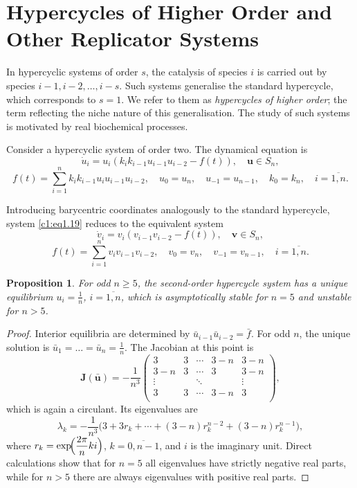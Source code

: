 \documentclass[12pt]{report}
\newtheorem{proposition}[theorem]{Proposition}
\theoremstyle{definition}
\theoremstyle{remark}
\begin{document}
\section{Hypercycles of Higher Order and Other Replicator Systems}
\label{c1:section:1.4}


In hypercyclic systems of order $s$, the catalysis of species $i$
is carried out by species $i-1, i-2, \ldots, i-s$. Such systems
generalise the standard hypercycle, which corresponds to $s=1$.
We refer to them as \emph{hypercycles of higher order}; the term
reflecting the niche nature of this generalisation. The study of
such systems is motivated by real biochemical processes.

Consider a hypercyclic system of order two.  The dynamical equation is
\begin{equation}
  \dot{u}_{i}=u_{i}(k_{i}k_{i-1}u_{i-1}u_{i-2}-f(t)),
  \quad \mathbf{u}\in S_{n},
  \label{c1:eq1.19}
\end{equation}
\[
  f(t)=\sum_{i=1}^{n}k_{i}k_{i-1}u_{i}u_{i-1}u_{i-2},\quad
  u_{0}=u_{n},\quad u_{-1}=u_{n-1},\quad k_{0}=k_{n},\quad
  i=\overline{1,n}.
\]

Introducing barycentric coordinates analogously to the standard
hypercycle, system \eqref{c1:eq1.19} reduces to the equivalent system
\begin{equation}
  \dot{v}_{i}=v_{i}(v_{i-1}v_{i-2}-f(t)),\quad \mathbf{v}\in S_{n},
  \label{c1:eq1.20}
\end{equation}
\[
  f(t)=\sum_{i=1}^{n}v_{i}v_{i-1}v_{i-2},\quad v_{0}=v_{n},\quad
  v_{-1}=v_{n-1},\quad i=\overline{1,n}.
\]

\begin{proposition}
For odd $n\geqslant 5$, the second-order hypercycle system has a unique
equilibrium $u_{i}=\frac{1}{n}$, $i=\overline{1,n}$, which is
asymptotically stable for $n=5$ and unstable for $n>5$.
\end{proposition}

\begin{proof}
Interior equilibria are determined by
$\bar{u}_{i-1}\bar{u}_{i-2}=\bar{f}$.
For odd $n$, the unique solution is
$\bar{u}_{1}=\ldots=\bar{u}_{n}=\frac{1}{n}$.
The Jacobian at this point is
\[
  \mathbf{J}(\bar{\mathbf{u}})=-\frac{1}{n^{3}}
  \begin{pmatrix}
    3 & 3 & \cdots & 3-n & 3-n\\
    3-n & 3 & \cdots & 3 & 3-n\\
    \vdots & & \ddots & & \vdots\\
    3 & 3 & \cdots & 3-n & 3\\
  \end{pmatrix},
\]
which is again a circulant.  Its eigenvalues are
\[
  \lambda_{k}=-\frac{1}{n^{3}}
  \bigl(3+3r_{k}+\cdots+(3-n)r_{k}^{n-2}+(3-n)r_{k}^{n-1}\bigr),
\]
where $r_{k}=\exp\!\Bigl(\dfrac{2\pi}{n}ki\Bigr)$, 
$k=\overline{0,n-1}$, and $i$ is the imaginary unit.
Direct calculations show that for $n=5$ all eigenvalues have strictly
negative real parts, while for $n>5$ there are always eigenvalues with
positive real parts.  
\end{proof}
\end{document}

